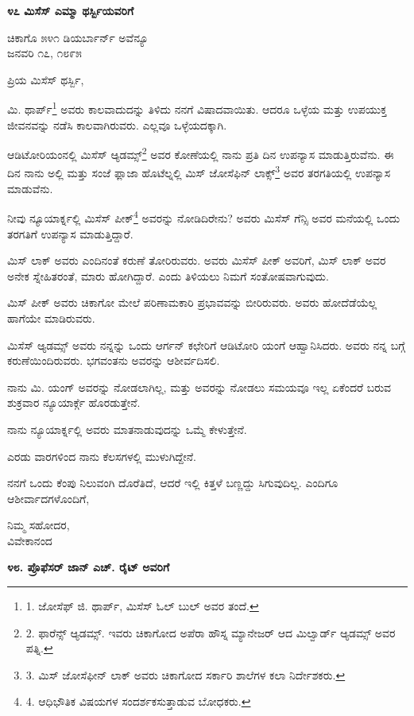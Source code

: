 \begin{center}
\textbf{೪೭ ಮಿಸೆಸ್ ಎಮ್ಮಾ ಥರ್ಸ್ಬಿಯವರಿಗೆ}
\end{center}

\begin{flushright}
ಚಿಕಾಗೊ ೫೪೧ ಡಿಯರ್ಬಾರ್ನ್ ಅವೆನ್ಯೂ\\ಜನವರಿ ೧೭, ೧೮೯೫
\end{flushright}

ಪ್ರಿಯ ಮಿಸೆಸ್ ಥರ್ಸ್ಬಿ,

ಮಿ. ಥಾರ್ಪ್\footnote{1. ಜೋಸೆಫ್ ಜಿ. ಥಾರ್ಪ್, ಮಿಸೆಸ್ ಓಲ್ ಬುಲ್ ಅವರ ತಂದೆ.} ಅವರು ಕಾಲವಾದುದನ್ನು ತಿಳಿದು ನನಗೆ ವಿಷಾದವಾಯಿತು. ಆದರೂ ಒಳ್ಳೆಯ ಮತ್ತು ಉಪಯುಕ್ತ ಜೀವನವನ್ನು ನಡೆಸಿ ಕಾಲವಾಗಿರುವರು. ಎಲ್ಲವೂ ಒಳ್ಳೆಯದಕ್ಕಾಗಿ.

ಆಡಿಟೋರಿಯಂನಲ್ಲಿ ಮಿಸೆಸ್ ಆ್ಯಡಮ್ಸ್\footnote{2. ಫಾರೆನ್ಸ್ ಆ್ಯಡಮ್ಸ್. ಇವರು ಚಿಕಾಗೋದ ಅಪೆರಾ ಹೌಸ್ನ ಮ್ಯಾನೇಜರ್ ಆದ ಮಿಲ್ವಾರ್ಡ್ ಆ್ಯಡಮ್ಸ್ ಅವರ ಪತ್ನಿ.} ಅವರ ಕೋಣೆಯಲ್ಲಿ ನಾನು ಪ್ರತಿ ದಿನ ಉಪನ್ಯಾಸ ಮಾಡುತ್ತಿರುವೆನು. ಈ ದಿನ ನಾನು ಅಲ್ಲಿ ಮತ್ತು ಸಂಜೆ ಫ್ಲಾಜಾ ಹೊಟೆಲ್ನಲ್ಲಿ ಮಿಸ್ ಜೋಸೆಫಿನ್ ಲಾಕ್ಸ್\footnote{3. ಮಿಸ್ ಜೋಸೆಫೀನ್ ಲಾಕ್ ಅವರು ಚಿಕಾಗೋದ ಸರ್ಕಾರಿ ಶಾಲೆಗಳ ಕಲಾ ನಿರ್ದೇಶಕರು.} ಅವರ ತರಗತಿಯಲ್ಲಿ ಉಪನ್ಯಾಸ ಮಾಡುವೆನು.

ನೀವು ನ್ಯೂಯಾರ್ಕ್ನಲ್ಲಿ ಮಿಸೆಸ್ ಪೀಕ್\footnote{4. ಆಧಿಭೌತಿಕ ವಿಷಯಗಳ ಸಂದರ್ಶಕಸುತ್ತಾಡುವ ಬೋಧಕರು.} ಅವರನ್ನು ನೋಡಿದಿರೇನು? ಅವರು ಮಿಸೆಸ್ ಗೆನ್ಸಿ ಅವರ ಮನೆಯಲ್ಲಿ ಒಂದು ತರಗತಿಗೆ ಉಪನ್ಯಾಸ ಮಾಡುತ್ತಿದ್ದಾರೆ.

ಮಿಸ್ ಲಾಕ್ ಅವರು ಎಂದಿನಂತೆ ಕರುಣೆ ತೋರಿರುವರು. ಅವರು ಮಿಸೆಸ್ ಪೀಕ್ ಅವರಿಗೆ, ಮಿಸ್ ಲಾಕ್ ಅವರ ಅನೇಕ ಸ್ನೇಹಿತರಂತೆ, ಮಾರು ಹೋಗಿದ್ದಾರೆ. ಎಂದು ತಿಳಿಯಲು ನಿಮಗೆ ಸಂತೋಷವಾಗುವುದು.

ಮಿಸ್ ಪೀಕ್ ಅವರು ಚಿಕಾಗೋ ಮೇಲೆ ಪರಿಣಾಮಕಾರಿ ಪ್ರಭಾವವನ್ನು ಬೀರಿರುವರು. ಅವರು ಹೋದೆಡೆಯೆಲ್ಲ ಹಾಗೆಯೇ ಮಾಡಿರುವರು.

ಮಿಸೆಸ್ ಆ್ಯಡಮ್ಸ್ ಅವರು ನನ್ನನ್ನು ಒಂದು ಆರ್ಗನ್ ಕಛೇರಿಗೆ ಆಡಿಟೋರಿ ಯಂಗೆ ಆಹ್ವಾನಿಸಿದರು. ಅವರು ನನ್ನ ಬಗ್ಗೆ ಕರುಣೆಯಿಂದಿರುವರು. ಭಗವಂತನು ಅವರನ್ನು ಆಶೀರ್ವದಿಸಲಿ.

ನಾನು ಮಿ. ಯಂಗ್ ಅವರನ್ನು ನೋಡಲಾಗಿಲ್ಲ, ಮತ್ತು ಅವರನ್ನು ನೋಡಲು ಸಮಯವೂ ಇಲ್ಲ ಏಕೆಂದರೆ ಬರುವ ಶುಕ್ರವಾರ ನ್ಯೂಯಾರ್ಕ್ಗೆ ಹೊರಡುತ್ತೇನೆ.

ನಾನು ನ್ಯೂಯಾರ್ಕ್ನಲ್ಲಿ ಅವರು ಮಾತನಾಡುವುದನ್ನು ಒಮ್ಮೆ ಕೇಳುತ್ತೇನೆ.

ಎರಡು ವಾರಗಳಿಂದ ನಾನು ಕೆಲಸಗಳಲ್ಲಿ ಮುಳುಗಿದ್ದೇನೆ.

ನನಗೆ ಒಂದು ಕೆಂಪು ನಿಲುವಂಗಿ ದೊರೆತಿದೆ, ಆದರೆ ಇಲ್ಲಿ ಕಿತ್ತಳೆ ಬಣ್ಣದ್ದು ಸಿಗುವುದಿಲ್ಲ. ಎಂದಿಗೂ ಆಶೀರ್ವಾದಗಳೊಂದಿಗೆ,

\begin{flushright}
ನಿಮ್ಮ ಸಹೋದರ,\\ವಿವೇಕಾನಂದ
\end{flushright}

\begin{center}
\textbf{೪೮. ಪ್ರೊಫೆಸರ್ ಜಾನ್ ಎಚ್. ರೈಟ್ ಅವರಿಗೆ}
\end{center}


